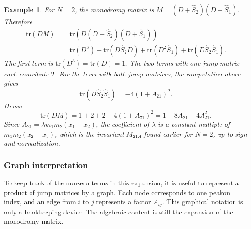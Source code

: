 \documentclass[english,master]{liumaiex}
\theoremstyle{thesisplain}
\theoremstyle{thesisdefinition}
\newtheorem{example}[proposition]{Example}
\newcommand{\tr}{\text{tr}}
\numberwithin{equation}{section}
\begin{document}
\begin{example}
For $N=2$, the monodromy matrix is $M=(D+\hat{S}_2)(D+\hat{S}_1)$. Therefore
\begin{equation}
\begin{aligned}
	\tr(DM)
	&= \tr(D(D+\hat{S}_2)(D+\hat{S}_1)) \\
	&= \tr(D^3) + \tr(D\hat{S}_2D) + \tr(D^2\hat{S}_1) + \tr(D\hat{S}_2\hat{S}_1).
\end{aligned}
\end{equation}
The first term is $\tr(D^3)=\tr(D)=1$. The two terms with one jump matrix each contribute $2$. For the term with both jump matrices, the computation above gives
\begin{equation}
	\tr(D\hat{S}_2\hat{S}_1) = -4(1+A_{21})^2.
\end{equation}
Hence
\begin{equation}
	\tr(DM) = 1 + 2 + 2 - 4(1+A_{21})^2 = 1 - 8A_{21} - 4A_{21}^2.
\end{equation}
Since $A_{21}=\lambda m_1m_2(x_1-x_2)$, the coefficient of $\lambda$ is a constant multiple of $m_1m_2(x_2-x_1)$, which is the invariant $M_{21A}$ found earlier for $N=2$, up to sign and normalization.
\end{example}

\subsubsection*{Graph interpretation}

To keep track of the nonzero terms in this expansion, it is useful to represent a product of jump matrices by a graph. Each node corresponds to one peakon index, and an edge from $i$ to $j$ represents a factor $A_{ij}$. This graphical notation is only a bookkeeping device. The algebraic content is still the expansion of the monodromy matrix.
\end{document}

